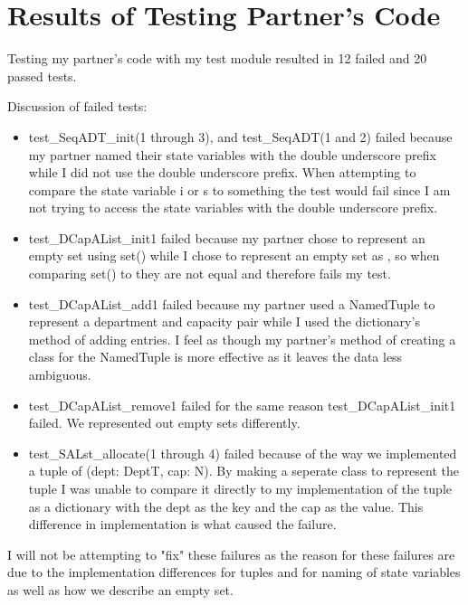 \documentclass[12pt]{article}
\begin{document}
\newpage

\section{Results of Testing Partner's Code}

Testing my partner's code with my test module resulted in 12 failed and 20 passed tests. 

\noindent Discussion of failed tests:
\begin{itemize}
	\item test\_SeqADT\_init(1 through 3), and test\_SeqADT(1 and 2) failed because my partner named their state variables with the double
	underscore prefix while I did not use the double underscore prefix. When attempting to compare the state variable i or s to something
	the test would fail since I am not trying to access the state variables with the double underscore prefix.
	
	\item test\_DCapAList\_init1 failed because my partner chose to represent an empty set using set() while I chose to represent an empty 
	set as {}, so when comparing set() to {} they are not equal and therefore fails my test.
	
	\item test\_DCapAList\_add1 failed because my partner used a NamedTuple to represent a department and capacity pair while I used the 
	dictionary's method of adding entries. I feel as though my partner's method of creating a class for the NamedTuple is more effective
	as it leaves the data less ambiguous.
	
	\item test\_DCapAList\_remove1 failed for the same reason test\_DCapAList\_init1 failed. We represented out empty sets differently.
	
	\item test\_SALst\_allocate(1 through 4) failed because of the way we implemented a tuple of (dept: DeptT, cap: N). By making 
	a seperate class to represent the tuple I was unable to compare it directly to my implementation of the tuple as a dictionary with
	the dept as the key and the cap as the value. This difference in implementation is what caused the failure. 
\end{itemize}

I will not be attempting to "fix" these failures as the reason for these failures are due to the implementation differences for tuples and
for naming of state variables as well as how we describe an empty set. 
\end{document}
